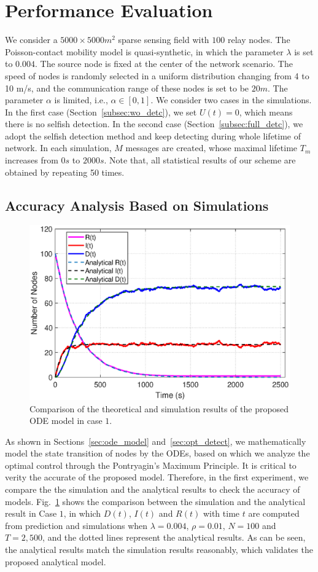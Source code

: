 \section{Performance Evaluation}
\label{sec:pe}
We consider a $5000 \times 5000 m^2$ sparse sensing field with
$100$ relay nodes.
The Poisson-contact
mobility model is quasi-synthetic,
in which the parameter $\lambda$ is set to $0.004$.
The source node is fixed at the center of the network scenario.
The speed of nodes is randomly selected in a uniform distribution
changing from 4 to 10 m/s,
and the communication range of these nodes is set to be $20$$m$.
The parameter $\alpha$ is limited,
i.e.,
$\alpha \in [0, 1]$.
We consider two cases in the simulations.
In the first case (Section~\ref{subsec:wo_detc}),
we set $U(t)=0$,
which means there is no selfish detection.
In the second case (Section~\ref{subsec:full_detc}),
we adopt the selfish detection method and keep detecting during whole lifetime of network.
In each simulation,
$M$ messages are created,
whose maximal lifetime $T_m$ increases from $0$$s$ to $2000$$s$.
Note that,
all statistical results of our scheme are obtained by
repeating 50 times.

\subsection{Accuracy Analysis Based on Simulations}
\label{subsec:pe_valid}
\begin{figure}
  \includegraphics[width=.45\textwidth]{fig/twohop_without_detection.eps}
  \caption{Comparison of the theoretical and simulation results of the proposed ODE model in  case $1$.}
  \label{fig:twohop_predict_wod}
\end{figure}
As shown in Sections~\ref{sec:ode_model} and~\ref{sec:opt_detect},
we mathematically model the state transition of nodes by the ODEs,
based on which we analyze the optimal control through the Pontryagin's Maximum Principle.
It is critical to verity the accurate of the proposed model.
Therefore,
in the first experiment,
we compare the the simulation and the analytical results to check the accuracy of models.
Fig.~\ref{fig:twohop_predict_wod} shows
the comparison between the simulation and the analytical result in Case $1$,
in which $D(t)$, $I(t)$ and $R(t)$ with time $t$ are computed from prediction and simulations
when $\lambda = 0.004$, $\rho = 0.01$, $N=100$ and $T=2,500$,
and the dotted lines represent the analytical results.
As can be seen,
the analytical results match the simulation results reasonably,
which validates the proposed analytical model.

